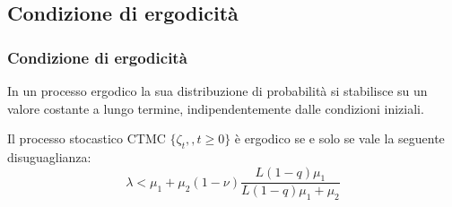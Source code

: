 \documentclass{beamer}
\begin{document}

\subsection{Condizione di ergodicità}


\begin{frame}
    \frametitle{Condizione di ergodicità}
    In un processo ergodico la sua distribuzione di probabilità si stabilisce su un valore costante a lungo termine, indipendentemente dalle condizioni iniziali.
    \begin{theorem}
        Il processo stocastico CTMC $\{\zeta_t,,t\geq 0\}$ è ergodico se e solo se vale la seguente disuguaglianza:
        \begin{equation*}\label{eq:ergodicity}
            \lambda < \mu_1 + \mu_2(1 - \nu) \frac{L(1-q)\mu_1}{L(1-q)\mu_1 + \mu_2}
        \end{equation*}
    \end{theorem}
\end{frame}
\end{document}
